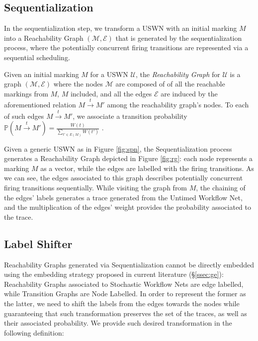 \subsection{Sequentialization}\label{sec:seqZ}
In the sequentialization step, we transform a USWN with an initial marking $M$ into a Reachability Graph $(\mathcal{M},\mathcal{E})$ that is generated by the sequentialization process, where the potentially concurrent firing transitions are represented via a sequential scheduling. 

\begin{definition}
	Given an initial marking $M$ for a USWN $\mathcal{U}$,  the \textit{Reachability Graph} for $\mathcal{U}$ is a graph $(\mathcal{M},\mathcal{E})$ where the nodes  $\mathcal{M}$ are composed of of all the reachable markings from $M$, $M$ included, and all the edges $\mathcal{E}$ are induced by the aforementioned relation $M\overset{t}{\to}M'$ among the reachability graph's nodes. To each of such edges $M\overset{t}{\to}M'$, we associate a transition probability $\mathbb{P}\left(M\overset{t}{\to}M'\right)=\frac{W(t)}{\sum_{t'\in E(M)}W(t')}$ \cite{spdwe}. 
\end{definition}

\begin{example}
Given a generic USWN as in Figure \ref{fig:spn}, the Sequentialization process generates a Reachability Graph depicted in Figure \ref{fig:rg}: each node represents a marking $M$ as a vector, while the edges are labelled with the firing transitions. As we can see, the edges associated to this graph describes potentially concurrent firing transitions sequentially. While visiting the graph from $M$, the chaining of the edges' labels generates a trace generated from the Untimed Workflow Net, and the multiplication of the edges' weight provides the probability associated to the trace.
\end{example}



\subsection{Label Shifter}\label{sec:LSift}
Reachability Graphs generated via Sequentialization cannot be directly embedded using the embedding strategy proposed in current literature (\S\ref{ssec:ge}):  Reachability Graphs associated to Stochastic Workflow Nets are edge labelled, while Transition Graphs are Node Labelled. In order to represent the former as the latter, we need to shift the labels from the edges towards the nodes  while guaranteeing that such transformation preserves the set of the traces, as well as their associated probability. We provide such desired transformation in the following definition:

